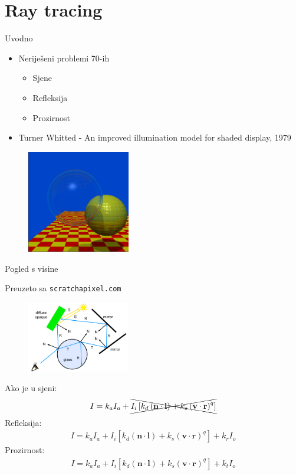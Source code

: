 \documentclass[9pt]{beamer}
\begin{document}
\section{Ray tracing}
\begin{frame}{Uvodno}
\begin{itemize}
	\item Neriješeni problemi 70-ih
	\begin{itemize}
		\item Sjene
		\item Refleksija
		\item Prozirnost
	\end{itemize}
	\item Turner Whitted - An improved illumination model for shaded display, 1979
\end{itemize}
\begin{figure}
	\includegraphics[width=0.4\textwidth]{./slike/whitted-spheres.jpg}
\end{figure}
\end{frame}

\begin{frame}{Pogled s visine}
\begin{tiny}
	Preuzeto sa \texttt{scratchapixel.com}
\end{tiny}

\begin{figure}
	\includegraphics[width=0.4\textwidth]{./slike/rt-whitted-example.png}	
\end{figure}
Ako je u sjeni:
\begin{align*}
I = k_aI_a + \xcancel{I_i\left[k_d\left(\mathbf{n}\cdot\mathbf{l}\right)+
k_s\left(\mathbf{v}\cdot\mathbf{r}\right)^q\right]}
\end{align*}
Refleksija:
\begin{align*}
I = k_aI_a + I_i\left[k_d\left(\mathbf{n}\cdot\mathbf{l}\right)+
	k_s\left(\mathbf{v}\cdot\mathbf{r}\right)^q\right] + k_rI_o
\end{align*}
Prozirnost:
\begin{align*}
I = k_aI_a + I_i\left[k_d\left(\mathbf{n}\cdot\mathbf{l}\right)+
k_s\left(\mathbf{v}\cdot\mathbf{r}\right)^q\right] + k_tI_o
\end{align*}
\end{frame}
\end{document}
